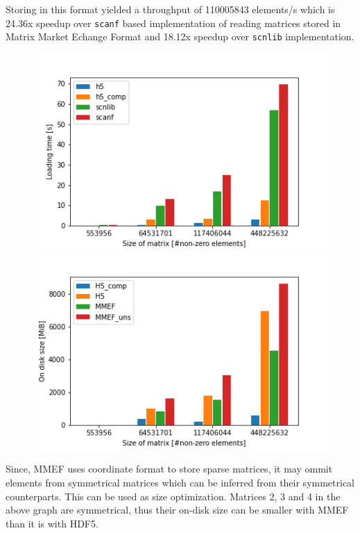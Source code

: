\documentclass[thesis=M,english]{FITthesis}[2019/12/23]
\begin{document}
Storing in this format yielded a throughput of 110005843 elements/s which is 24.36x speedup over \texttt{scanf}
based implementation of reading matrices stored in Matrix Market Echange Format and 18.12x speedup over \texttt{scnlib}
implementation.

\begin{figure}[!h]
    \centering
    \begin{minipage}{.5\textwidth}
        \centering
        \includegraphics[scale=0.45]{static/matrix_loading.png}
    \end{minipage}%
    \begin{minipage}{.5\textwidth}
        \centering
        \includegraphics[scale=0.45]{static/storage_sizes.png}
    \end{minipage}
\end{figure}


Since, MMEF uses coordinate format to store sparse matrices, it may ommit elements from symmetrical matrices which can be inferred
from their symmetrical counterparts. This can be used as size optimization. Matrices 2, 3 and 4 in the above graph are symmetrical,
thus their on-disk size can be smaller with MMEF than it is with HDF5.
\end{document}
